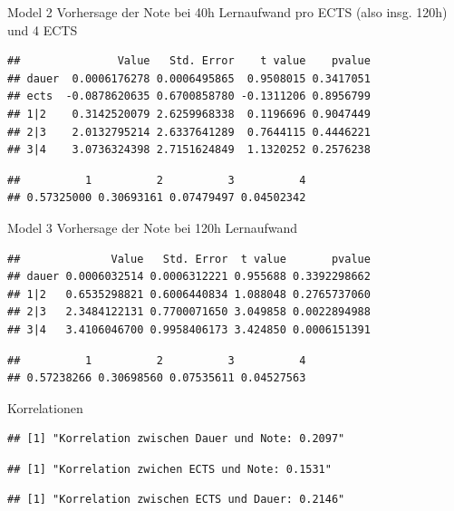 \documentclass[
  ignorenonframetext,
]{beamer}
\begin{document}
\begin{frame}[fragile]
\begin{block}{Model 2}
\protect\hypertarget{model-2}{}
Vorhersage der Note bei 40h Lernaufwand pro ECTS (also insg. 120h) und 4
ECTS

\begin{verbatim}
##               Value   Std. Error    t value    pvalue
## dauer  0.0006176278 0.0006495865  0.9508015 0.3417051
## ects  -0.0878620635 0.6700858780 -0.1311206 0.8956799
## 1|2    0.3142520079 2.6259968338  0.1196696 0.9047449
## 2|3    2.0132795214 2.6337641289  0.7644115 0.4446221
## 3|4    3.0736324398 2.7151624849  1.1320252 0.2576238
\end{verbatim}

\begin{verbatim}
##          1          2          3          4 
## 0.57325000 0.30693161 0.07479497 0.04502342
\end{verbatim}
\end{block}
\end{frame}

\begin{frame}[fragile]
\begin{block}{Model 3}
\protect\hypertarget{model-3}{}
Vorhersage der Note bei 120h Lernaufwand

\begin{verbatim}
##              Value   Std. Error  t value       pvalue
## dauer 0.0006032514 0.0006312221 0.955688 0.3392298662
## 1|2   0.6535298821 0.6006440834 1.088048 0.2765737060
## 2|3   2.3484122131 0.7700071650 3.049858 0.0022894988
## 3|4   3.4106046700 0.9958406173 3.424850 0.0006151391
\end{verbatim}

\begin{verbatim}
##          1          2          3          4 
## 0.57238266 0.30698560 0.07535611 0.04527563
\end{verbatim}
\end{block}
\end{frame}

\begin{frame}[fragile]
\begin{block}{Korrelationen}
\protect\hypertarget{korrelationen}{}
\begin{verbatim}
## [1] "Korrelation zwischen Dauer und Note: 0.2097"
\end{verbatim}

\begin{verbatim}
## [1] "Korrelation zwichen ECTS und Note: 0.1531"
\end{verbatim}

\begin{verbatim}
## [1] "Korrelation zwischen ECTS und Dauer: 0.2146"
\end{verbatim}
\end{block}
\end{frame}
\end{document}
